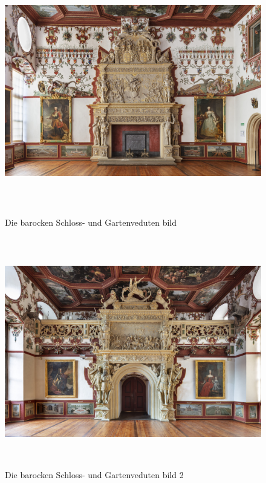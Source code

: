 \documentclass[
  a4paper,
]{book}
\begin{document}
\begin{figure}
\includegraphics[height=10cm]{images/fmd10005861a.jpg}

\caption{Die barocken Schloss- und Gartenveduten bild}
\label{fig:{images/fmd10005861a.jpg}}

\clearpage

\centering

\includegraphics[height=10cm]{images/fmd10005863a.jpg}

\caption{Die barocken Schloss- und Gartenveduten bild 2}
\label{fig:{images/fmd10005863a.jpg}}

\clearpage

\centering


\end{figure}
\end{document}
